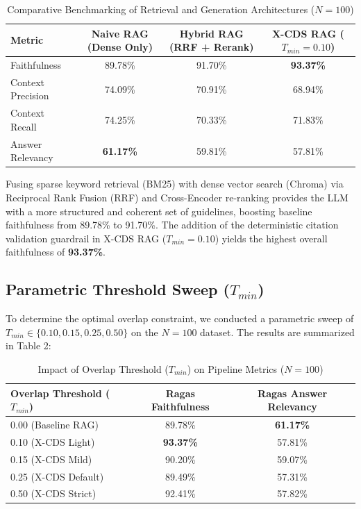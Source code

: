 \documentclass[sn-mathphys,Numbered]{sn-jnl}%
\begin{document}
\begin{table}[ht]
\centering
\caption{Comparative Benchmarking of Retrieval and Generation Architectures ($N=100$)}
\label{tab1}
\begin{tabular}{lccc}
\toprule
Metric & Naive RAG (Dense Only) & Hybrid RAG (RRF + Rerank) & X-CDS RAG ($T_{min}=0.10$) \\
\midrule
Faithfulness & 89.78\% & 91.70\% & \textbf{93.37\%} \\
Context Precision & 74.09\% & 70.91\% & 68.94\% \\
Context Recall & 74.25\% & 70.33\% & 71.83\% \\
Answer Relevancy & \textbf{61.17\%} & 59.81\% & 57.81\% \\
\bottomrule
\end{tabular}
\end{table}

Fusing sparse keyword retrieval (BM25) with dense vector search (Chroma) via Reciprocal Rank Fusion (RRF) and Cross-Encoder re-ranking provides the LLM with a more structured and coherent set of guidelines, boosting baseline faithfulness from 89.78\% to 91.70\%. The addition of the deterministic citation validation guardrail in X-CDS RAG ($T_{min}=0.10$) yields the highest overall faithfulness of \textbf{93.37\%}.

\subsection{Parametric Threshold Sweep ($T_{min}$)}
To determine the optimal overlap constraint, we conducted a parametric sweep of $T_{min} \in \{0.10, 0.15, 0.25, 0.50\}$ on the $N=100$ dataset. The results are summarized in Table 2:

\begin{table}[ht]
\centering
\caption{Impact of Overlap Threshold ($T_{min}$) on Pipeline Metrics ($N=100$)}
\label{tab2}
\begin{tabular}{lcc}
\toprule
Overlap Threshold ($T_{min}$) & Ragas Faithfulness & Ragas Answer Relevancy \\
\midrule
0.00 (Baseline RAG) & 89.78\% & \textbf{61.17\%} \\
0.10 (X-CDS Light) & \textbf{93.37\%} & 57.81\% \\
0.15 (X-CDS Mild) & 90.20\% & 59.07\% \\
0.25 (X-CDS Default) & 89.49\% & 57.31\% \\
0.50 (X-CDS Strict) & 92.41\% & 57.82\% \\
\bottomrule
\end{tabular}
\end{table}
\end{document}
